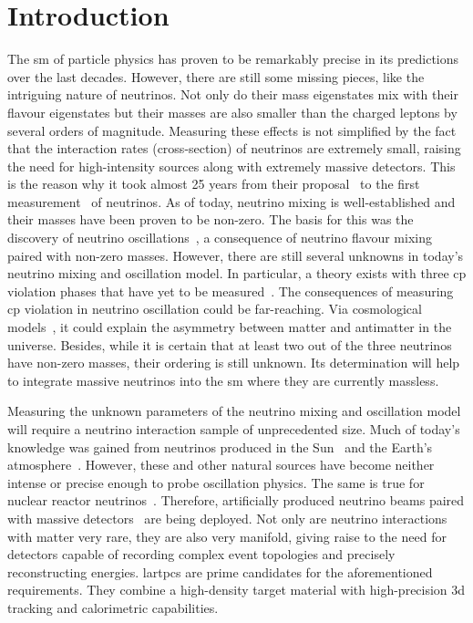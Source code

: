 \chapter{Introduction}
\label{chap:introduction}

The \gls{sm} of particle physics has proven to be remarkably precise in its predictions over the last decades.
However, there are still some missing pieces, like the intriguing nature of neutrinos.
Not only do their mass eigenstates mix with their flavour eigenstates but their masses are also smaller than the charged leptons by several orders of magnitude.
Measuring these effects is not simplified by the fact that the interaction rates (cross-section) of neutrinos are extremely small, raising the need for high-intensity sources along with extremely massive detectors.
This is the reason why it took almost \num{25} years from their proposal~\cite{pauliLetter} to the first measurement~\cite{reinesCowan} of neutrinos.
As of today, neutrino mixing is well-established and their masses have been proven to be non-zero.
The basis for this was the discovery of neutrino oscillations~\cite{superKAtmos1, superKAtmos2, snoSolar}, a consequence of neutrino flavour mixing~\cite{pontecorvo, makiNakagawaSakata} paired with non-zero masses.
However, there are still several unknowns in today's neutrino mixing and oscillation model.
In particular, a theory exists with three \gls{cp} violation phases that have yet to be measured~\cite{pontecorvo, makiNakagawaSakata, mariuana}.
The consequences of measuring \gls{cp} violation in neutrino oscillation could be far-reaching.
Via cosmological models~\cite{pdg}, it could explain the asymmetry between matter and antimatter in the universe.
Besides, while it is certain that at least two out of the three neutrinos have non-zero masses, their ordering is still unknown.
Its determination will help to integrate massive neutrinos into the \gls{sm} where they are currently massless.

Measuring the unknown parameters of the neutrino mixing and oscillation model will require a neutrino interaction sample of unprecedented size.
Much of today's knowledge was gained from neutrinos produced in the Sun~\cite{homestake68, homestake98, snoSolar} and the Earth's atmosphere~\cite{superKAtmos1, superKAtmos2}.
However, these and other natural sources have become neither intense or precise enough to probe oscillation physics.
The same is true for nuclear reactor neutrinos~\cite{reinesCowan, dayabayRecent}.
Therefore, artificially produced neutrino beams paired with massive detectors~\cite{t2kOsc} are being deployed.
Not only are neutrino interactions with matter very rare, they are also very manifold, giving raise to the need for detectors capable of recording complex event topologies and precisely reconstructing energies.
\glspl{lartpc} are prime candidates for the aforementioned requirements.
They combine a high-density target material with high-precision \gls{3d} tracking and calorimetric capabilities.

